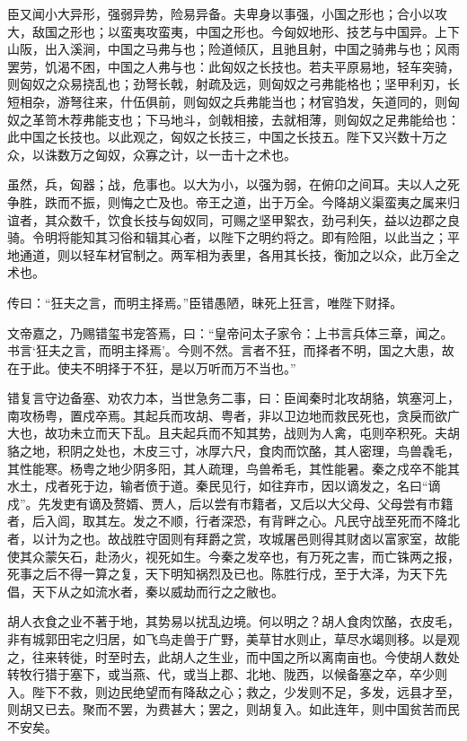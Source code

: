 \documentclass[12pt,UTF8]{ctexbook}
\begin{document}
臣又闻小大异形，强弱异势，险易异备。夫卑身以事强，小国之形也；合小以攻大，敌国之形也；以蛮夷攻蛮夷，中国之形也。今匈奴地形、技艺与中国异。上下山阪，出入溪涧，中国之马弗与也；险道倾仄，且驰且射，中国之骑弗与也；风雨罢劳，饥渴不困，中国之人弗与也：此匈奴之长技也。若夫平原易地，轻车突骑，则匈奴之众易挠乱也；劲弩长戟，射疏及远，则匈奴之弓弗能格也；坚甲利刃，长短相杂，游弩往来，什伍俱前，则匈奴之兵弗能当也；材官驺发，矢道同的，则匈奴之革笥木荐弗能支也；下马地斗，剑戟相接，去就相薄，则匈奴之足弗能给也：此中国之长技也。以此观之，匈奴之长技三，中国之长技五。陛下又兴数十万之众，以诛数万之匈奴，众寡之计，以一击十之术也。



虽然，兵，匈器；战，危事也。以大为小，以强为弱，在俯卬之间耳。夫以人之死争胜，跌而不振，则悔之亡及也。帝王之道，出于万全。今降胡义渠蛮夷之属来归谊者，其众数千，饮食长技与匈奴同，可赐之坚甲絮衣，劲弓利矢，益以边郡之良骑。令明将能知其习俗和辑其心者，以陛下之明约将之。即有险阻，以此当之；平地通道，则以轻车材官制之。两军相为表里，各用其长技，衡加之以众，此万全之术也。



传曰：“狂夫之言，而明主择焉。”臣错愚陋，昧死上狂言，唯陛下财择。



文帝嘉之，乃赐错玺书宠答焉，曰：“皇帝问太子家令：上书言兵体三章，闻之。书言‘狂夫之言，而明主择焉’。今则不然。言者不狂，而择者不明，国之大患，故在于此。使夫不明择于不狂，是以万听而万不当也。”



错复言守边备塞、劝农力本，当世急务二事，曰：臣闻秦时北攻胡貉，筑塞河上，南攻杨粤，置戍卒焉。其起兵而攻胡、粤者，非以卫边地而救民死也，贪戾而欲广大也，故功未立而天下乱。且夫起兵而不知其势，战则为人禽，屯则卒积死。夫胡貉之地，积阴之处也，木皮三寸，冰厚六尺，食肉而饮酪，其人密理，鸟兽毳毛，其性能寒。杨粤之地少阴多阳，其人疏理，鸟兽希毛，其性能暑。秦之戍卒不能其水土，戍者死于边，输者偾于道。秦民见行，如往弃市，因以谪发之，名曰“谪戍”。先发吏有谪及赘婿、贾人，后以尝有市籍者，又后以大父母、父母尝有市籍者，后入闾，取其左。发之不顺，行者深恐，有背畔之心。凡民守战至死而不降北者，以计为之也。故战胜守固则有拜爵之赏，攻城屠邑则得其财卤以富家室，故能使其众蒙矢石，赴汤火，视死如生。今秦之发卒也，有万死之害，而亡铢两之报，死事之后不得一算之复，天下明知祸烈及已也。陈胜行戍，至于大泽，为天下先倡，天下从之如流水者，秦以威劫而行之之敝也。



胡人衣食之业不著于地，其势易以扰乱边境。何以明之？胡人食肉饮酪，衣皮毛，非有城郭田宅之归居，如飞鸟走兽于广野，美草甘水则止，草尽水竭则移。以是观之，往来转徙，时至时去，此胡人之生业，而中国之所以离南亩也。今使胡人数处转牧行猎于塞下，或当燕、代，或当上郡、北地、陇西，以候备塞之卒，卒少则入。陛下不救，则边民绝望而有降敌之心；救之，少发则不足，多发，远县才至，则胡又已去。聚而不罢，为费甚大；罢之，则胡复入。如此连年，则中国贫苦而民不安矣。
\end{document}
